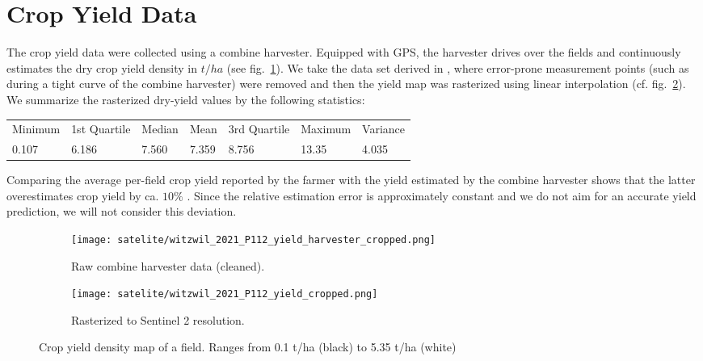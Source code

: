 {{		%
		
		

	}
}

\section{Crop Yield Data}{
	\label{sec:yieldmapping_data}
	The crop yield data were collected using a combine harvester. Equipped with GPS, the harvester drives over the fields and continuously estimates the dry crop yield density in $t/ha$ (see fig.~\ref{fig:satelite/witzwil_2021_P112_yield_harvester_cropped}). 
	We take the data set derived in \cite{perichPixelbasedCropYield2022}, where error-prone measurement points (such as during a tight curve of the combine harvester) were removed and then the yield map was rasterized using linear interpolation (cf. fig.~\ref{fig:satelite/witzwil_2021_P112_yield_cropped.png}). We summarize the rasterized dry-yield values by the following statistics:

	\begin{tabular}{l l l l l l l} 
		Minimum & 1st Quartile & Median & Mean  & 3rd Quartile & Maximum & Variance \\
		0.107   & 6.186        & 7.560  & 7.359 & 8.756        & 13.35   & 4.035
	\end{tabular}    

	Comparing the average per-field crop yield reported by the farmer with the yield estimated by the combine harvester shows that the latter overestimates crop yield by ca. $10\%$ \citep{perichPixelbasedCropYield2022}. Since the relative estimation error is approximately constant and we do not aim for an accurate yield prediction, we will not consider this deviation. 



	\begin{figure}
		\centering
		\begin{subfigure}{.5\textwidth}
			\centering
			\texttt{[image: satelite/witzwil\_2021\_P112\_yield\_harvester\_cropped.png]}
			\caption{Raw combine harvester data (cleaned).}
			\label{fig:satelite/witzwil_2021_P112_yield_harvester_cropped}
		\end{subfigure}%
		\begin{subfigure}{.5\textwidth}
			\centering
			\texttt{[image: satelite/witzwil\_2021\_P112\_yield\_cropped.png]}
			\caption{Rasterized to Sentinel 2 resolution.}
			\label{fig:satelite/witzwil_2021_P112_yield_cropped.png}
		\end{subfigure}
		\caption[Crop yield density map of a field]{Crop yield density map of a field. Ranges from 0.1 t/ha (black) to 5.35 t/ha (white) }
		\label{fig:satelite_witzwil_yield}
	\end{figure}

}

